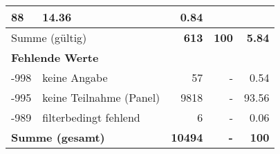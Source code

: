 \begin{longtable}{lXrrr}
       \num{88} &
       \num[round-mode=places,round-precision=2]{14.36} &
         \num[round-mode=places,round-precision=2]{0.84} \\
     \midrule
     \multicolumn{2}{l}{Summe (gültig)} &
       \textbf{\num{613}} &
     \textbf{\num{100}} &
       \textbf{\num[round-mode=places,round-precision=2]{5.84}} \\
     \multicolumn{5}{l}{\textbf{Fehlende Werte}}\\
       -998 &
       keine Angabe &
         \num{57} &
        - &
         \num[round-mode=places,round-precision=2]{0.54} \\
       -995 &
       keine Teilnahme (Panel) &
         \num{9818} &
        - &
         \num[round-mode=places,round-precision=2]{93.56} \\
       -989 &
       filterbedingt fehlend &
         \num{6} &
        - &
         \num[round-mode=places,round-precision=2]{0.06} \\
     \midrule
     \multicolumn{2}{l}{\textbf{Summe (gesamt)}} &
          \textbf{\num{10494}} &
        \textbf{-} &
        \textbf{\num{100}} \\
     \bottomrule
     \end{longtable}
     
